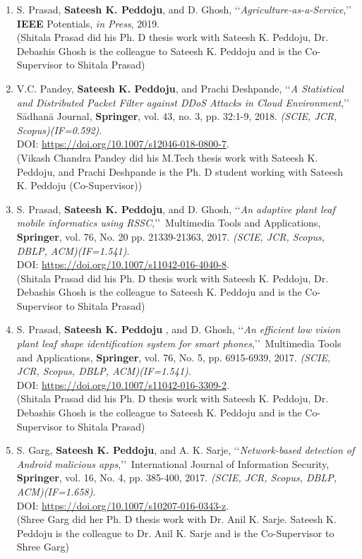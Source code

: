 \begin{enumerate}%
	\item
	S. Prasad, \textbf{Sateesh K. Peddoju}, and D. Ghosh, \lq\lq \textit{Agriculture-as-a-Service},\rq\rq\, {\textbf{IEEE} Potentials}, \textit{in Press}, 2019.  \\(Shitala Prasad did his Ph. D thesis work with Sateesh K. Peddoju, Dr. Debashis Ghosh is the colleague to Sateesh K. Peddoju and is the Co-Supervisor to Shitala Prasad)
	
	\item
	V.C. Pandey, \textbf{Sateesh K. Peddoju}, and Prachi Deshpande, \lq\lq \textit{A Statistical and Distributed Packet Filter against DDoS Attacks in Cloud Environment},\rq\rq\, S{\={a}}dhan{\={a}} Journal, \textbf{Springer}, vol. 43, no. 3, pp. 32:1-9, 2018. \emph{(SCIE, JCR, Scopus)(IF=0.592)}. \\DOI: \url{https://doi.org/10.1007/s12046-018-0800-7}.  \\(Vikash Chandra Pandey did his M.Tech thesis work with Sateesh K. Peddoju, and Prachi Deshpande is the Ph. D student working with Sateesh K. Peddoju (Co-Supervisor))
	
	\item
	S. Prasad, \textbf{Sateesh K. Peddoju}, and D. Ghosh, \lq\lq \textit{An adaptive plant leaf mobile informatics using RSSC},\rq\rq\, Multimedia Tools and Applications, \textbf{Springer}, vol. 76, No. 20 pp. 21339-21363, 2017. \emph{(SCIE, JCR, Scopus, DBLP, ACM)(IF=1.541)}. \\DOI: \url{https://doi.org/10.1007/s11042-016-4040-8}.  \\(Shitala Prasad did his Ph. D thesis work with Sateesh K. Peddoju, Dr. Debashis Ghosh is the colleague to Sateesh K. Peddoju and is the Co-Supervisor to Shitala Prasad)
	
	\item
	S. Prasad, \textbf{Sateesh K. Peddoju} , and D. Ghosh, \lq\lq \textit{An efficient low vision plant leaf shape identification system for smart phones},\rq\rq\, Multimedia Tools and Applications, \textbf{Springer}, vol. 76, No. 5, pp. 6915-6939, 2017. \emph{(SCIE, JCR, Scopus, DBLP, ACM)(IF=1.541)}. \\DOI: \url{https://doi.org/10.1007/s11042-016-3309-2}.  \\(Shitala Prasad did his Ph. D thesis work with Sateesh K. Peddoju, Dr. Debashis Ghosh is the colleague to Sateesh K. Peddoju and is the Co-Supervisor to Shitala Prasad)
	
	\item
	S. Garg, \textbf{Sateesh K. Peddoju}, and A. K. Sarje, \lq\lq \textit{Network-based detection of Android malicious apps},\rq\rq\, International Journal of Information Security, \textbf{Springer}, vol. 16, No. 4, pp. 385-400, 2017. \emph{(SCIE, JCR, Scopus, DBLP, ACM)(IF=1.658)}. \\DOI: \url{https://doi.org/10.1007/s10207-016-0343-z}. \\(Shree Garg did her Ph. D thesis work with Dr. Anil K. Sarje.  Sateesh K. Peddoju is the colleague to Dr. Anil K. Sarje and is the Co-Supervisor to Shree Garg)
	

\end{enumerate}
